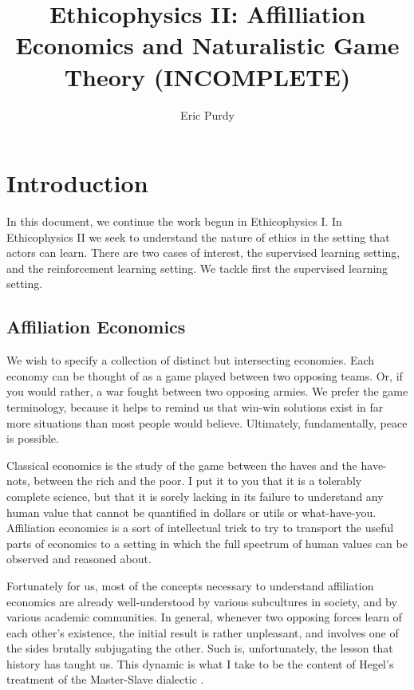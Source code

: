 \documentclass{article}
\title{Ethicophysics II: Affilliation Economics and Naturalistic Game
Theory (INCOMPLETE)}
\author{Eric Purdy}
\begin{document}
\maketitle

\begin{abstract}
\end{abstract}

\section{Introduction}

In this document, we continue the work begun in Ethicophysics I. In
Ethicophysics II we seek to understand the nature of ethics in the
setting that actors can learn. There are two cases of interest, the
supervised learning setting, and the reinforcement learning
setting. We tackle first the supervised learning setting.

\subsection{Affiliation Economics}

We wish to specify a collection of distinct but intersecting
economies. Each economy can be thought of as a game played between two
opposing teams. Or, if you would rather, a war fought between two
opposing armies. We prefer the game terminology, because it helps to
remind us that win-win solutions exist in far more situations than
most people would believe. Ultimately, fundamentally, peace is
possible.

Classical economics is the study of the game between the haves and the
have-nots, between the rich and the poor. I put it to you that it is a
tolerably complete science, but that it is sorely lacking in its
failure to understand any human value that cannot be quantified in
dollars or utils or what-have-you. Affiliation economics is a sort of
intellectual trick to try to transport the useful parts of economics
to a setting in which the full spectrum of human values can be
observed and reasoned about.

Fortunately for us, most of the concepts necessary to understand
affiliation economics are already well-understood by various
subcultures in society, and by various academic communities. In
general, whenever two opposing forces learn of each other's existence,
the initial result is rather unpleasant, and involves one of the sides
brutally subjugating the other. Such is, unfortunately, the lesson
that history has taught us. This dynamic is what I take to be the
content of Hegel's treatment of the Master-Slave dialectic
\cite{hegel}.
\end{document}
